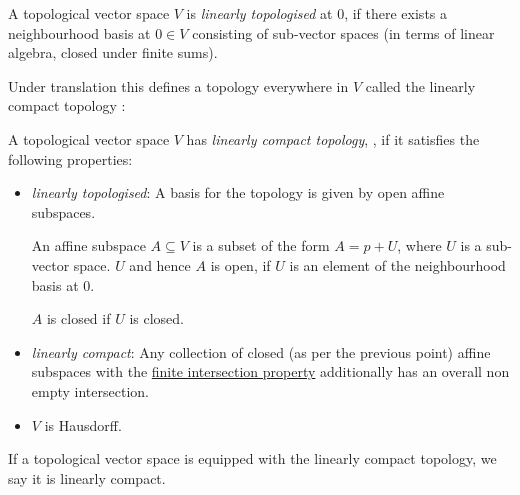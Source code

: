         \begin{defn}
        A topological vector space \(V\) is \emph{linearly topologised} at \(0\), if there exists a neighbourhood basis at \(0 \in V\) consisting of sub-vector spaces (in terms of linear algebra, closed under finite sums).
        \end{defn}    
            
        Under translation this defines a topology everywhere in \(V\) called the linearly compact topology \cite{dieudonne, lefschetz1942algebraic,leinster}:
        
        \begin{defn}
        \label{defn:lctop}
        A topological vector space \(V\) has \emph{linearly compact topology}, \cite[p.~74]{lefschetz1942algebraic}, if it satisfies the following properties:
        \begin{itemize} 
            \item \emph{linearly topologised}: A basis for the topology is given by open affine subspaces. 
            
            An affine subspace \(A \subseteq V \) is a subset of the form \( A =  p + U \), where \(U\) is a sub-vector space. \(U\) and hence \(A\) is open, if \(U\) is an element of the neighbourhood basis at \(0\).
            
            \(A\) is closed if \(U\) is closed.
            
            \item \emph{linearly compact}: Any collection of closed (as per the previous point) affine subspaces with the 
            \hyperref[defn:finintprop]{finite intersection property} additionally has an overall non empty intersection.
    
            \item \(V\) is Hausdorff.
        \end{itemize}
        \end{defn}
        If a topological vector space is equipped with the linearly compact topology, we say it is linearly compact.
    
